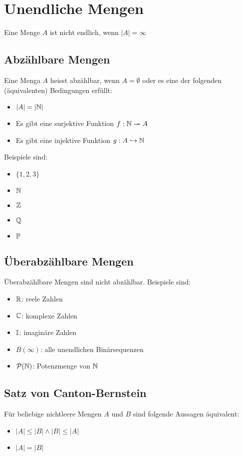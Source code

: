 \section{Unendliche Mengen}
Eine Menge $A$ ist nicht endlich, wenn $|A| = \infty$
\subsection{Abzählbare Mengen}
Eine Menga $A$ heisst abzählbar, wenn $A = \emptyset$ oder es eine der folgenden (äquivalenten)
Bedingungen erfüllt:
\begin{itemize}
	\item $|A| = |\mathbb{N}|$
	\item Es gibt eine surjektive Funktion $f: \mathbb{N} \twoheadrightarrow A$
	\item Es gibt eine injektive Funktion $g: A \hookrightarrow \mathbb{N}$
\end{itemize}
Beispiele sind:
\begin{itemize}
	\item $\{1,2,3\}$
	\item $\mathbb{N}$
	\item $\mathbb{Z}$
	\item $\mathbb{Q}$
	\item $\mathbb{P}$
\end{itemize}
\subsection{Überabzählbare Mengen}
Überabzählbare Mengen sind nicht abzählbar.
Beispiele sind:
\begin{itemize}
	\item $\mathbb{R}$: reele Zahlen
	\item $\mathbb{C}$: komplexe Zahlen
	\item $\mathbb{I}$: imaginäre Zahlen
	\item $B(\infty)$: alle unendlichen Binärsequenzen
	\item $\mathcal{P}(\mathbb{N})$: Potenzmenge von $\mathbb{N}$
\end{itemize}
\subsection{Satz von Canton-Bernstein}
Für beliebige nichtleere Mengen $A$ und $B$ sind folgende Aussagen
äquivalent:
\begin{itemize}
	\item $|A| \leq |B| \wedge |B| \leq |A|$
	\item $|A| = |B|$
\end{itemize}

